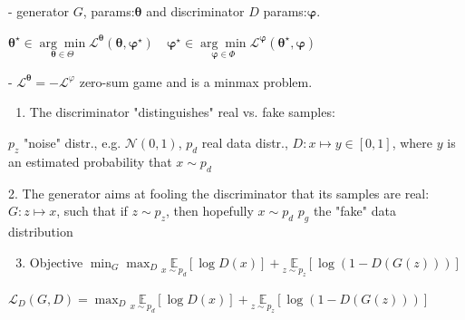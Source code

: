 - generator $G$, params:$\boldsymbol{\theta}$ and discriminator $D$ params:$\boldsymbol{\varphi}$. 



$\boldsymbol{\theta}^{\star} \in \underset{\boldsymbol{\theta} \in \Theta}{\arg \min } \mathcal{L}^{\boldsymbol{\theta}}(\boldsymbol{\theta}, \boldsymbol{\varphi}^{\star}) \quad \boldsymbol{\varphi}^{\star} \in \underset{\boldsymbol{\varphi} \in \Phi}{\arg \min } \mathcal{L}^{\boldsymbol{\varphi}}(\boldsymbol{\theta}^{\star}, \boldsymbol{\varphi})$

- $\mathcal{L}^{\boldsymbol{\theta}}=-\mathcal{L}^{\varphi}$ zero-sum game and is a minmax problem.

\begin{enumerate}
  \item The discriminator "distinguishes" real vs. fake samples:
\end{enumerate}

$p_{z}$ "noise" distr., e.g. $\mathcal{N}(0,1)$, 
$p_{d}$ real data distr.,
$D: x \mapsto y \in[0,1]$, where $y$ is an estimated probability that $x \sim p_{d}$

2. The generator aims at fooling the discriminator that its samples are real:
$G: z \mapsto x$, such that if $z \sim p_{z}$, then hopefully $x \sim p_{d}$
$p_{g}$ the "fake" data distribution

\begin{enumerate}
  \setcounter{enumi}{2}
  \item Objective
  $
  \min _{G} \max _{D} \underset{x \sim p_{d}}{\mathbb{E}}[\log D(x)]+\underset{z \sim p_{z}}{\mathbb{E}}[\log (1-D(G(z)))]
  $
\end{enumerate}




$\mathscr{L}_{D}(G, D)=\max _{D} \underset{x \sim p_{d}}{\mathbb{E}}[\log D(x)]+\underset{z \sim p_{z}}{\mathbb{E}}[\log (1-D(G(z)))]$

